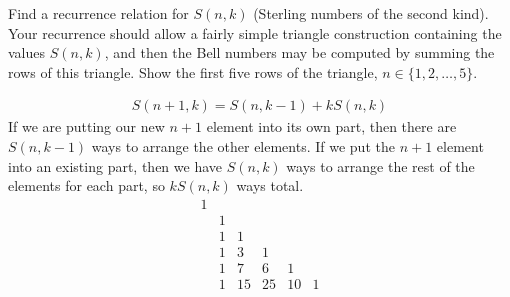 \documentclass[12pt]{article}
\newenvironment{exercise}[2][Exercise]{\begin{trivlist}
\item[\hskip \labelsep {\bfseries #1} \hskip \labelsep {\bfseries #2}]}{\end{trivlist}}
\begin{document}
\begin{exercise}{1.4.4. (1pt)}
	Find a recurrence relation for $S(n,k)$ (Sterling numbers of the second kind). Your recurrence should allow a fairly simple triangle construction containing the values $S(n,k)$, and then the Bell numbers may be computed by summing the rows of this triangle. Show the first five rows of the triangle, $n\in \{1,2,\ldots,5\}$. 	
\end{exercise}
\begin{align*}
	S(n+1,k) = S(n,k-1) + kS(n,k)
\end{align*}
If we are putting our new $n+1$ element into its own part, then there are $S(n,k-1)$ ways to arrange the other elements. If we put the $n+1$ element into an existing part, then we have $S(n,k)$ ways to arrange the rest of the elements for each part, so $kS(n,k)$ ways total. 
\[
\begin{array}{cccccc}
	1 &  &  &  &  &  \\
	 & 1 &  &  &  &  \\
	 & 1 & 1 &  &  &  \\
	 & 1 & 3 & 1 &  &  \\
	 & 1 & 7 & 6 & 1 &  \\
	 & 1 & 15 & 25 & 10 & 1
\end{array}
\]
\end{document}
